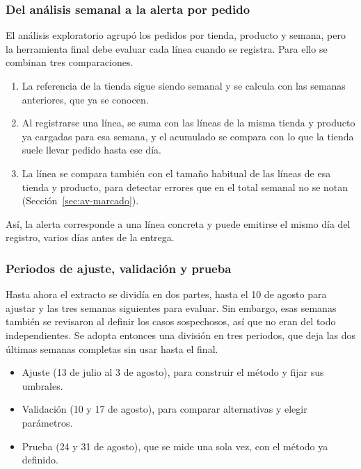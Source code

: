 \subsubsection{Del análisis semanal a la alerta por pedido}
\label{sec:av-pedido}

El análisis exploratorio agrupó los pedidos por tienda, producto y semana, pero la herramienta final debe evaluar cada línea cuando se registra. Para ello se combinan tres comparaciones.

\begin{enumerate}
\item La referencia de la tienda sigue siendo semanal y se calcula con las semanas anteriores, que ya se conocen.
\item Al registrarse una línea, se suma con las líneas de la misma tienda y producto ya cargadas para esa semana, y el acumulado se compara con lo que la tienda suele llevar pedido hasta ese día.
\item La línea se compara también con el tamaño habitual de las líneas de esa tienda y producto, para detectar errores que en el total semanal no se notan (Sección~\ref{sec:av-marcado}).
\end{enumerate}

Así, la alerta corresponde a una línea concreta y puede emitirse el mismo día del registro, varios días antes de la entrega.

\subsubsection{Periodos de ajuste, validación y prueba}
\label{sec:av-periodos}

Hasta ahora el extracto se dividía en dos partes, hasta el 10 de agosto para ajustar y las tres semanas siguientes para evaluar. Sin embargo, esas semanas también se revisaron al definir los casos sospechosos, así que no eran del todo independientes. Se adopta entonces una división en tres periodos, que deja las dos últimas semanas completas sin usar hasta el final.

\begin{itemize}
\item Ajuste (13 de julio al 3 de agosto), para construir el método y fijar sus umbrales.
\item Validación (10 y 17 de agosto), para comparar alternativas y elegir parámetros.
\item Prueba (24 y 31 de agosto), que se mide una sola vez, con el método ya definido.
\end{itemize}

